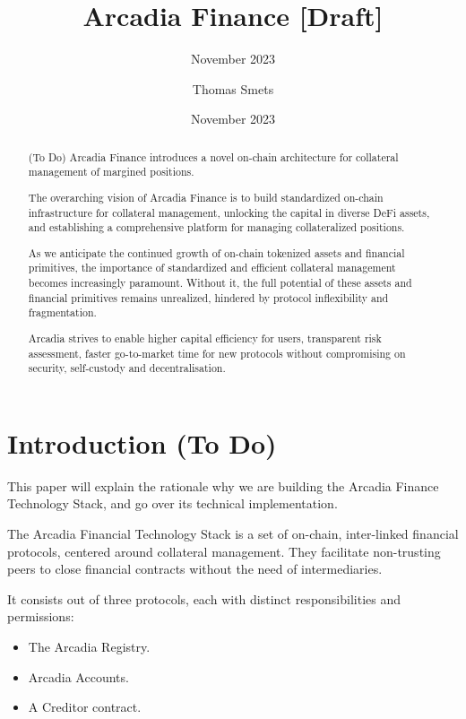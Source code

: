 \documentclass[sigconf,nonacm]{acmart}
\title{Arcadia Finance [Draft]}
\subtitle{November 2023}
\date{November 2023}
\author{Thomas Smets}
\affiliation{
    \institution{Arcadia Finance}
    \city{Brussels}
    \country{Belgium}
}
\begin{document}
\begin{abstract}
    (To Do)
    Arcadia Finance introduces a novel on-chain architecture for collateral management of margined positions.

    The overarching vision of Arcadia Finance is to build standardized on-chain infrastructure for collateral management,
    unlocking the capital in diverse DeFi assets, and establishing a comprehensive platform for managing collateralized positions. 

    As we anticipate the continued growth of on-chain tokenized assets and financial primitives, the importance of standardized and efficient collateral management becomes increasingly paramount.
    Without it, the full potential of these assets and financial primitives remains unrealized, hindered by protocol inflexibility and fragmentation.

    Arcadia strives to enable higher capital efficiency for users, transparent risk assessment, faster go-to-market time for new protocols without compromising on security, self-custody and decentralisation.
\end{abstract}


\maketitle

\section{Introduction (To Do)} 
\label{sec:introduction}
This paper will explain the rationale why we are building the Arcadia Finance Technology Stack, and go over its technical implementation.

The Arcadia Financial Technology Stack is a set of on-chain, inter-linked financial protocols, centered around collateral management.
They facilitate non-trusting peers to close financial contracts without the need of intermediaries.

It consists out of three protocols, each with distinct responsibilities and permissions:
\begin{itemize}
\item The Arcadia Registry.
\item Arcadia Accounts.
\item A Creditor contract.
\end{itemize}
\end{document}
